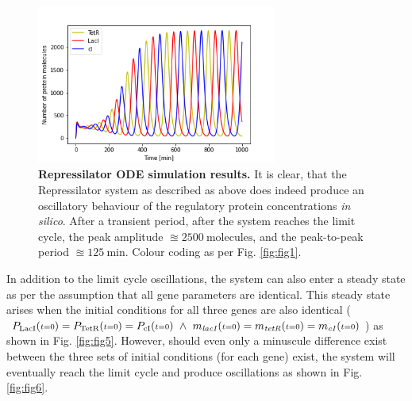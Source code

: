 \documentclass[runningheads,a4paper]{llncs}
\begin{document}
\vspace{-3\abovedisplayskip}
\begin{figure}
    \singlespacing
    \centering
    \includegraphics[width=0.70\textwidth]{suplementary_information_and_code/Task2_figure1.png}
    \caption{\textbf{Repressilator ODE simulation results.} It is clear, that the Repressilator system as described as above does indeed produce an oscillatory behaviour of the regulatory protein concentrations \textit{in silico}. After a transient period, after the system reaches the limit cycle, the peak amplitude $\approxeq 2500\ \textrm{molecules}$, and the peak-to-peak period $\approxeq 125\ \textrm{min}$. Colour coding as per Fig. \ref{fig:fig1}.}  
    \label{fig:fig4}
\end{figure}

In addition to the limit cycle oscillations, the system can also enter a steady state as per the assumption that all gene parameters are identical. This steady state arises when the initial conditions for all three genes are also identical ($P_{\textrm{LacI}}({\scriptstyle t=0}) = P_{\textrm{TetR}}({\scriptstyle t=0}) = P_{\textrm{cI}}({\scriptstyle t=0})\ \wedge\ m_{\textrm{\textit{lacI}}}({\scriptstyle t=0}) = m_{\textrm{\textit{tetR}}}({\scriptstyle t=0}) = m_{\textrm{\textit{cI}}}({\scriptstyle t=0})$) as shown in Fig. \ref{fig:fig5}. However, should even only a minuscule difference exist between the three sets of initial conditions (for each gene) exist, the system will eventually reach the limit cycle and produce oscillations as shown in Fig. \ref{fig:fig6}.
\end{document}
